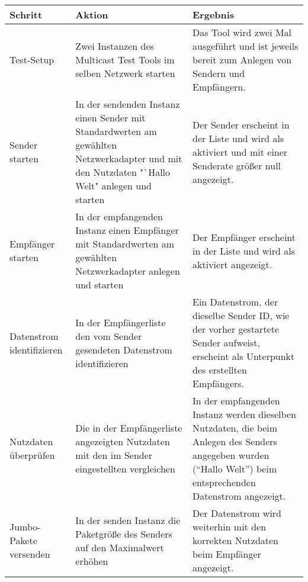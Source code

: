 \begin{table}[h]
\begin{center}
\begin{tabular}{|p{3.5cm}|p{5cm}|p{6.55cm}|}
                \hline
                    \textbf{Schritt} & \textbf{Aktion} & \textbf{Ergebnis}\\
                \hline
                    Test-Setup &
                    Zwei Instanzen des Multicast Test Tools im selben
                    Netzwerk starten &
                    Das Tool wird zwei Mal ausgeführt und ist jeweils bereit zum
                    Anlegen von Sendern und Empfängern.\\
                \hline
                    Sender starten &
                    In der sendenden Instanz einen Sender mit Standardwerten am
                    gewählten Netzwerkadapter und mit den Nutzdaten
                    "`Hallo Welt" anlegen und starten & Der Sender erscheint in
                    der Liste und wird als aktiviert und mit einer Senderate
                    größer null angezeigt.\\
                \hline
                    Empfänger starten &
                    In der empfangenden Instanz einen Empfänger mit
                    Standardwerten am gewählten Netzwerkadapter anlegen und
                    starten &
                    Der Empfänger erscheint in der Liste und wird als
                    aktiviert angezeigt.\\
                \hline
                    Datenstrom identifizieren &
                    In der Empfängerliste den vom Sender gesendeten Datenstrom
                    identifizieren & 
                    Ein Datenstrom, der dieselbe Sender ID, wie der vorher
                    gestartete Sender aufweist, erscheint als Unterpunkt des
                    erstellten Empfängers.\\
                \hline
                    Nutzdaten überprüfen &
                    Die in der Empfängerliste angezeigten Nutzdaten mit den im
                    Sender eingestellten vergleichen &
                    In der empfangenden Instanz werden dieselben Nutzdaten, die
                    beim Anlegen des Senders angegeben wurden ("`Hallo Welt"')
                    beim entsprechenden Datenstrom angezeigt.\\
                \hline
                    Jumbo-Pakete versenden &
                    In der senden Instanz die Paketgröße des Senders auf den
                    Maximalwert erhöhen &
                    Der Datenstrom wird weiterhin mit den korrekten Nutzdaten
                    beim Empfänger angezeigt.\\
                \hline
            \end{tabular}
        \end{center}
    \end{table}

